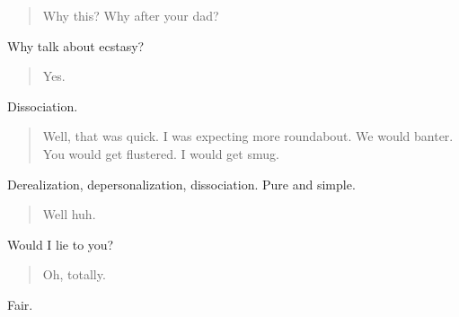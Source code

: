 \begin{quote}
Why this? Why after your dad?
\end{quote}

Why talk about ecstasy?

\begin{quote}
Yes.
\end{quote}

Dissociation.

\begin{quote}
Well, that was quick. I was expecting more roundabout. We would banter. You would get flustered. I would get smug.
\end{quote}

Derealization, depersonalization, dissociation. Pure and simple.

\begin{quote}
Well huh.
\end{quote}

Would I lie to you?

\begin{quote}
Oh, totally.
\end{quote}

Fair.

